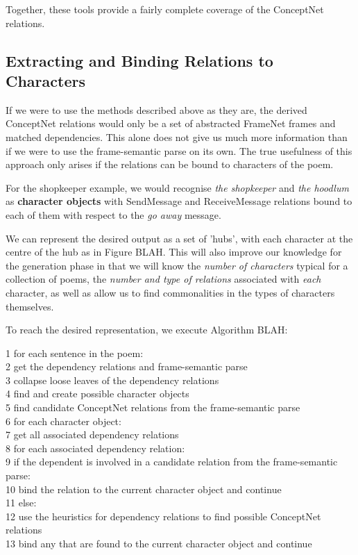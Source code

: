 Together, these tools provide a fairly complete coverage of the ConceptNet relations.


\subsection{Extracting and Binding Relations to Characters}

If we were to use the methods described above as they are, the derived ConceptNet relations would only be a set of abstracted FrameNet frames and matched dependencies. This alone does not give us much more information than if we were to use the frame-semantic parse on its own. The true usefulness of this approach only arises if the relations can be bound to characters of the poem. 

For the shopkeeper example, we would recognise \textit{the shopkeeper} and \textit{the hoodlum} as \textbf{character objects} with SendMessage and ReceiveMessage relations bound to each of them with respect to the \textit{go away} message.

We can represent the desired output as a set of 'hubs', with each character at the centre of the hub as in Figure BLAH. This will also improve our knowledge for the generation phase in that we will know the \textit{number of characters} typical for a collection of poems, the \textit{number and type of relations} associated with \textit{each} character, as well as allow us to find commonalities in the types of characters themselves.

To reach the desired representation, we execute Algorithm BLAH:

1 for each sentence in the poem:\\
2   get the dependency relations and frame-semantic parse\\
3	collapse loose leaves of the dependency relations\\
4	find and create possible character objects\\
5	find candidate ConceptNet relations from the frame-semantic parse\\
6	for each character object:\\
7		get all associated dependency relations\\
8		for each associated dependency relation:\\
9			if the dependent is involved in a candidate relation from the frame-semantic parse:\\
10				bind the relation to the current character object and continue\\
11			else:\\
12				use the heuristics for dependency relations to find possible ConceptNet relations\\
13				bind any that are found to the current character object and continue\\
				
